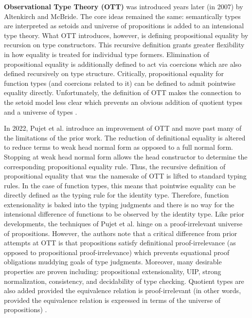 \textbf{Observational Type Theory (OTT)} was introduced years later (in 2007) by Altenkirch and McBride.
The core ideas remained the same: semantically types are interpreted as setoids and universe of propositions is added to an intensional type theory.
What OTT introduces, however, is defining propositional equality by recursion on type constructors.
This recursive definition grants greater flexibility in how equality is treated for individual type formers.
Elimination of propositional equality is additionally defined to act via coercions which are also defined recursively on type structure.
Critically, propositional equality for function types (and coercions related to it) can be defined to admit pointwise equality directly.
Unfortunately, the definition of OTT makes the connection to the setoid model less clear which prevents an obvious addition of quotient types and a universe of types \cite{altenkirch2007}.

In 2022, Pujet et al. introduce an improvement of OTT and move past many of the limitations of the prior work.
The reduction of definitional equality is altered to reduce terms to weak head normal form as opposed to a full normal form.
Stopping at weak head normal form allows the head constructor to determine the corresponding propositional equality rule.
Thus, the recursive definition of propositional equality that was the namesake of OTT is lifted to standard typing rules.
In the case of function types, this means that pointwise equality can be directly defined as the typing rule for the identity type.
Therefore, function extensionality is baked into the typing judgments and there is no way for the intensional difference of functions to be observed by the identity type.
Like prior developments, the techniques of Pujet et al. hinge on a proof-irrelevant universe of propositions.
However, the authors note that a critical difference from prior attempts at OTT is that propositions satisfy definitional proof-irrelevance (as opposed to propositional proof-irrelevance) which prevents equational proof obligations muddying goals of type judgments.
Moreover, many desirable properties are proven including: propositional extensionality, UIP, strong normalization, consistency, and decidability of type checking.
Quotient types are also added provided the equivalence relation is proof-irrelevant (in other words, provided the equivalence relation is expressed in terms of the universe of propositions) \cite{pujet2022}.

